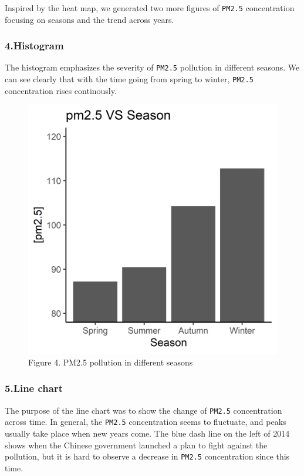 \documentclass[]{article}
\begin{document}
Inspired by the heat map, we generated two more figures of
\texttt{PM2.5} concentration focusing on seasons and the trend across
years.

\hypertarget{histogram}{%
\subsubsection{4.Histogram}\label{histogram}}

The histogram emphasizes the severity of \texttt{PM2.5} pollution in
different seasons. We can see clearly that with the time going from
spring to winter, \texttt{PM2.5} concentration rises continously.

\begin{figure}
\centering
\includegraphics{../images/season_PM2.5.png}
\caption{Figure 4. PM2.5 pollution in different seasons}
\end{figure}

\hypertarget{line-chart}{%
\subsubsection{5.Line chart}\label{line-chart}}

The purpose of the line chart was to show the change of \texttt{PM2.5}
concentration across time. In general, the \texttt{PM2.5} concentration
seems to fluctuate, and peaks usually take place when new years come.
The blue dash line on the left of 2014 shows when the Chinese government
launched a plan to fight against the pollution, but it is hard to
observe a decrease in \texttt{PM2.5} concentration since this time.
\end{document}
